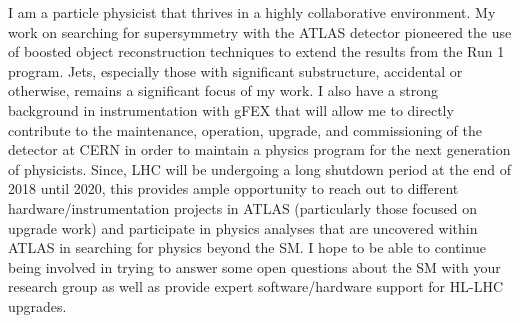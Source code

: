 I am a particle physicist that thrives in a highly collaborative environment. My work on searching for supersymmetry with the ATLAS detector pioneered the use of boosted object reconstruction techniques to extend the results from the Run 1 program. Jets, especially those with significant substructure, accidental or otherwise, remains a significant focus of my work. I also have a strong background in instrumentation with gFEX that will allow me to directly contribute to the maintenance, operation, upgrade, and commissioning of the detector at CERN in order to maintain a physics program for the next generation of physicists. Since, LHC will be undergoing a long shutdown period at the end of 2018 until 2020, this provides ample opportunity to reach out to different hardware/instrumentation projects in ATLAS (particularly those focused on upgrade work) and participate in physics analyses that are uncovered within ATLAS in searching for physics beyond the SM. I hope to be able to continue being involved in trying to answer some open questions about the SM with your research group as well as provide expert software/hardware support for HL-LHC upgrades.

\vspace{0.25cm}

\begin{footnotesize}


\end{footnotesize}


